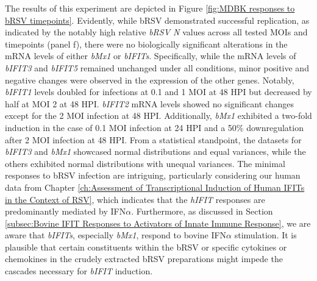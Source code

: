 The results of this experiment are depicted in Figure \ref{fig:MDBK responses to bRSV timepoints}. Evidently, while bRSV demonstrated successful replication, as indicated by the notably high relative \textit{bRSV N} values across all tested MOIs and timepoints (panel f), there were no biologically significant alterations in the mRNA levels of either \textit{bMx1} or \textit{bIFITs}. Specifically, while the mRNA levels of \textit{bIFIT3} and \textit{bIFIT5} remained unchanged under all conditions, minor positive and negative changes were observed in the expression of the other genes. Notably, \textit{bIFIT1} levels doubled for infections at 0.1 and 1 MOI at 48 HPI but decreased by half at MOI 2 at 48 HPI. \textit{bIFIT2} mRNA levels showed no significant changes except for the 2 MOI infection at 48 HPI. Additionally, \textit{bMx1} exhibited a two-fold induction in the case of 0.1 MOI infection at 24 HPI and a 50\% downregulation after 2 MOI infection at 48 HPI. From a statistical standpoint, the datasets for \textit{bIFIT3} and \textit{bMx1} showcased normal distributions and equal variances, while the others exhibited normal distributions with unequal variances. The minimal responses to bRSV infection are intriguing, particularly considering our human data from Chapter \ref{ch:Assessment of Transcriptional Induction of Human IFITs in the Context of RSV}, which indicates that the \textit{hIFIT} responses are predominantly mediated by IFN\(\alpha\). Furthermore, as discussed in Section \ref{subsec:Bovine IFIT Responses to Activators of Innate Immune Response}, we are aware that \textit{bIFITs}, especially \textit{bMx1}, respond to bovine IFN\(\alpha\) stimulation. It is plausible that certain constituents within the bRSV or specific cytokines or chemokines in the crudely extracted bRSV preparations might impede the cascades necessary for \textit{bIFIT} induction.

